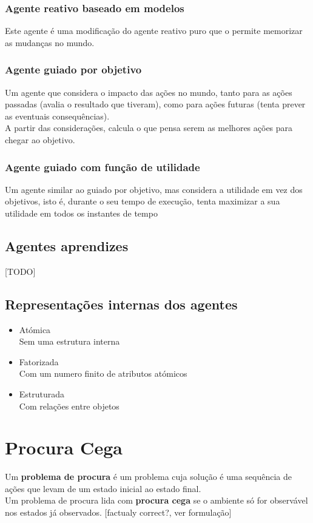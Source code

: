 \documentclass[]{report}
\begin{document}
\subsection{Agente reativo baseado em modelos}
Este agente é uma modificação do agente reativo puro que o permite memorizar as mudanças no mundo.
\subsection{Agente guiado por objetivo}
Um agente que considera o impacto das ações no mundo, tanto para as ações passadas (avalia o resultado que tiveram), como para ações futuras (tenta prever as eventuais consequências).\\
A partir das considerações, calcula o que pensa serem as melhores ações para chegar ao objetivo.
\subsection{Agente guiado com função de utilidade}
Um agente similar ao guiado por objetivo, mas considera a utilidade em vez dos objetivos, isto é, durante o seu tempo de execução, tenta maximizar a sua utilidade em todos os instantes de tempo
\section{Agentes aprendizes}
[TODO]
\section{Representações internas dos agentes}
\begin{itemize}
\item Atómica\\
Sem uma estrutura interna
\item Fatorizada\\
Com um numero finito de atributos atómicos
\item Estruturada\\
Com relações entre objetos
\end{itemize}
\chapter{Procura Cega}
Um \textbf{problema de procura} é um problema cuja solução é uma sequência de ações que levam de um estado inicial ao estado final.\\
Um problema de procura lida com \textbf{procura cega} se o ambiente só for observável nos estados já observados. [factualy correct?, ver formulação]
\end{document}
